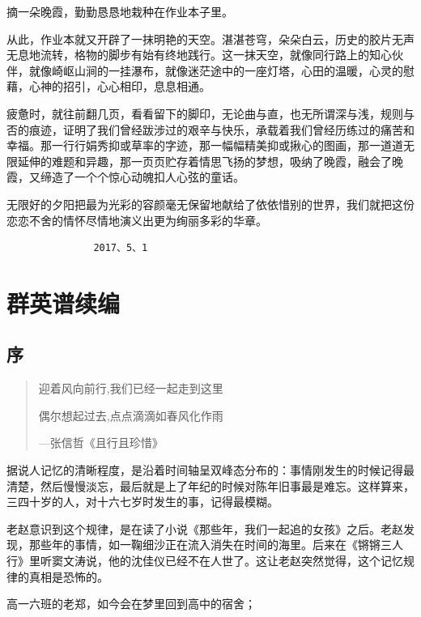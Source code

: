 \documentclass[openany]{ctexbook}
\begin{document}
摘一朵晚霞，勤勤恳恳地栽种在作业本子里。

从此，作业本就又开辟了一抹明艳的天空。湛湛苍穹，朵朵白云，历史的胶片无声无息地流转，格物的脚步有始有终地践行。这一抹天空，就像同行路上的知心伙伴，就像崎岖山涧的一挂瀑布，就像迷茫途中的一座灯塔，心田的温暖，心灵的慰藉，心神的招引，心心相印，息息相通。

疲惫时，就往前翻几页，看看留下的脚印，无论曲与直，也无所谓深与浅，规则与否的痕迹，证明了我们曾经跋涉过的艰辛与快乐，承载着我们曾经历练过的痛苦和幸福。那一行行娟秀抑或草率的字迹，那一幅幅精美抑或揪心的图画，那一道道无限延伸的难题和异趣，那一页页贮存着情思飞扬的梦想，吸纳了晚霞，融会了晚霞，又缔造了一个个惊心动魄扣人心弦的童话。

无限好的夕阳把最为光彩的容颜毫无保留地献给了依依惜别的世界，我们就把这份恋恋不舍的情怀尽情地演义出更为绚丽多彩的华章。

\begin{verbatim}
               2017、5、1
\end{verbatim}

\part{群英谱续编}\label{qyp}

\chapter*{序}\label{pre3}

\begin{quote}
迎着风向前行,我们已经一起走到这里

偶尔想起过去,点点滴滴如春风化作雨

\begin{flushright}---张信哲《且行且珍惜》\end{flushright}
\end{quote}

据说人记忆的清晰程度，是沿着时间轴呈双峰态分布的：事情刚发生的时候记得最清楚，然后慢慢淡忘，最后就是上了年纪的时候对陈年旧事最是难忘。这样算来，三四十岁的人，对十六七岁时发生的事，记得最模糊。

老赵意识到这个规律，是在读了小说《那些年，我们一起追的女孩》之后。老赵发现，那些年的事情，如一鞠细沙正在流入消失在时间的海里。后来在《锵锵三人行》里听窦文涛说，他的沈佳仪已经不在人世了。这让老赵突然觉得，这个记忆规律的真相是恐怖的。

高一六班的老郑，如今会在梦里回到高中的宿舍；
\end{document}
